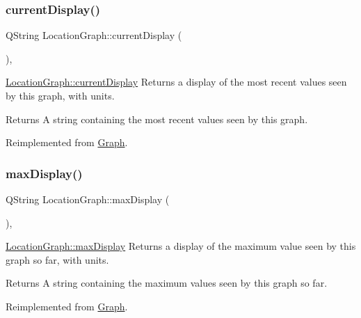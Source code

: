 \subsubsection{\texorpdfstring{current\+Display()}{currentDisplay()}}
{\footnotesize\ttfamily Q\+String Location\+Graph\+::current\+Display (\begin{DoxyParamCaption}{ }\end{DoxyParamCaption})\hspace{0.3cm}{\ttfamily [override]}, {\ttfamily [virtual]}}



\hyperlink{class_location_graph_ab0f46de5c3a6b72556762bbf02d6a4b3}{Location\+Graph\+::current\+Display} Returns a display of the most recent values seen by this graph, with units. 

\begin{DoxyReturn}{Returns}
A string containing the most recent values seen by this graph. 
\end{DoxyReturn}


Reimplemented from \hyperlink{class_graph_a85028910472bc7815ad024ca025bb142}{Graph}.

\hypertarget{class_location_graph_a8ac355338680e55af26cb3e74b76d278}{}\label{class_location_graph_a8ac355338680e55af26cb3e74b76d278} 
\subsubsection{\texorpdfstring{max\+Display()}{maxDisplay()}}
{\footnotesize\ttfamily Q\+String Location\+Graph\+::max\+Display (\begin{DoxyParamCaption}{ }\end{DoxyParamCaption})\hspace{0.3cm}{\ttfamily [override]}, {\ttfamily [virtual]}}



\hyperlink{class_location_graph_a8ac355338680e55af26cb3e74b76d278}{Location\+Graph\+::max\+Display} Returns a display of the maximum value seen by this graph so far, with units. 

\begin{DoxyReturn}{Returns}
A string containing the maximum values seen by this graph so far. 
\end{DoxyReturn}


Reimplemented from \hyperlink{class_graph_a5102e5e984c2ddebb79b9771b9d37f9f}{Graph}.



